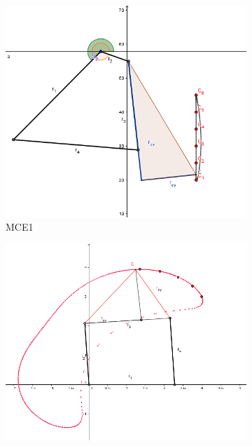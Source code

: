 \begin{figure}[h]
	\hspace{1cm}
	\centering
	\captionsetup{width=.85\linewidth}
	\begin{subfigure}[b]{0.46\linewidth}
		\centering
		\includegraphics[width=\linewidth]{Figures/MCE1}
		\caption{MCE1} \label{fig:M1} 
	\end{subfigure}\vspace{1cm} 
	\begin{subfigure}[b]{0.46\linewidth}
		\centering
		\includegraphics[width=\textwidth]{Figures/MCE2}

\end{subfigure}
\end{figure}
